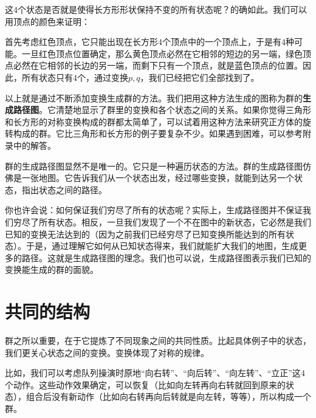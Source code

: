 \documentclass[12pt,UTF8,fontset=none]{ctexbook}
\begin{document}
这$4$个状态是否就是使得长方形形状保持不变的所有状态呢？的确如此。我们可以用顶点的颜色来证明：

首先考虑红色顶点，它只能出现在长方形$4$个顶点中的一个顶点上，于是有$4$种可能。一旦红色顶点位置确定，那么黄色顶点必然在它相邻的短边的另一端，绿色顶点必然在它相邻的长边的另一端，而剩下只有一个顶点，就是蓝色顶点的位置。因此，所有状态只有$4$个，通过变换$p,q$，我们已经把它们全部找到了。

以上就是通过不断添加变换生成群的方法。我们把用这种方法生成的图称为群的\textbf{生成路径图}。它清楚地显示了群里的变换和各个状态之间的关系。如果你觉得三角形和长方形的对称变换构成的群都太简单了，可以试着用这种方法来研究正方体的旋转构成的群。它比三角形和长方形的例子要复杂不少。如果遇到困难，可以参考附录中的解答。

群的生成路径图显然不是唯一的。它只是一种遍历状态的方法。群的生成路径图仿佛是一张地图。它告诉我们从一个状态出发，经过哪些变换，就能到达另一个状态，指出状态之间的路径。

你也许会说：如何保证我们穷尽了所有的状态呢？实际上，生成路径图并不保证我们穷尽了所有状态。相反，一旦我们发现了一个不在图中的新状态，它必然是我们已知的变换无法达到的（因为之前我们已经穷尽了已知变换所能达到的所有状态）。于是，通过理解它如何从已知状态得来，我们就能扩大我们的地图，生成更多的路径。这就是生成路径图的理念。我们也可以说，生成路径图表示我们已知的变换能生成的群的面貌。

\section{共同的结构}

群之所以重要，在于它提炼了不同现象之间的共同性质。比起具体例子中的状态，我们更关心状态之间的变换。变换体现了对称的规律。

比如，我们可以考虑队列操演时原地“向右转”、“向后转”、“向左转”、“立正”这$4$个动作。这些动作效果确定，可以恢复（比如向左转再向右转就回到原来的状态），组合后没有新动作（比如向右转再向后转就是向左转，等等），所以构成一个群。
\end{document}
